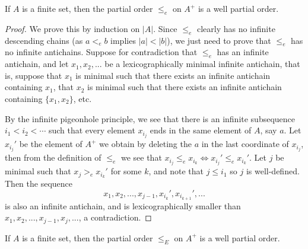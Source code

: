 \begin{thm} If $A$ is a finite set, then the partial order $\le_e$ on $A^+$ is a well partial order.
\end{thm}
\begin{proof} We prove this by induction on $|A|$. Since $\le_e$ clearly has no infinite descending chains (as $a <_e b$ implies $|a| < |b|$), we just need to prove that $\le_e$ has no infinite antichains. Suppose for contradiction that $\le_e$ has an infinite antichain, and let $x_1, x_2, ...$ be a lexicographically minimal infinite antichain, that is, suppose that $x_1$ is minimal such that there exists an infinite antichain containing $x_1$, that $x_2$ is minimal such that there exists an infinite antichain containing $\{x_1, x_2\}$, etc.

By the infinite pigeonhole principle, we see that there is an infinite subsequence $i_1 < i_2 < \cdots$ such that every element $x_{i_j}$ ends in the same element of $A$, say $a$. Let $x_{i_j}'$ be the element of $A^+$ we obtain by deleting the $a$ in the last coordinate of $x_{i_j}$, then from the definition of $\le_e$ we see that $x_{i_j} \le_e x_{i_k} \iff x_{i_j}' \le_e x_{i_k}'$. Let $j$ be minimal such that $x_j >_e x_{i_k}'$ for some $k$, and note that $j \le i_1$ so $j$ is well-defined. Then the sequence
\[
x_1, x_2, ..., x_{j-1}, x_{i_k}', x_{i_{k+1}}', ...
\]
is also an infinite antichain, and is lexicographically smaller than $x_1, x_2, ..., x_{j-1}, x_j, ...$, a contradiction.
\end{proof}

\begin{cor} If $A$ is a finite set, then the partial order $\le_E$ on $A^+$ is a well partial order.
\end{cor}

